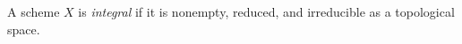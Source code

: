 
A scheme $X$ is \emph{integral} if it is nonempty, reduced, and irreducible as a topological space.
